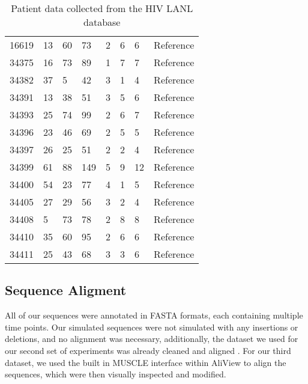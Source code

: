 \begin{table*}[!ht]
\begin{tabularx}{\textwidth}{| X | X | X | X | X | X | X | l |}
16619 &       13 &       60 &       73 &        2 &        6 &        6 & Reference \\ 
34375 &       16 &       73 &       89 &        1 &        7 &        7 & Reference \\ 
34382 &       37 &        5 &       42 &        3 &        1 &        4 & Reference \\ 
34391 &       13 &       38 &       51 &        3 &        5 &        6 & Reference  \\ 
34393 &       25 &       74 &       99 &        2 &        6 &        7 & Reference \\ 
34396 &       23 &       46 &       69 &        2 &        5 &        5 & Reference \\ 
34397 &       26 &       25 &       51 &        2 &        2 &        4 & Reference  \\ 
34399 &       61 &       88 &      149 &        5 &        9 &       12 & Reference \\ 
34400 &       54 &       23 &       77 &        4 &        1 &        5 & Reference \\ 
34405 &       27 &       29 &       56 &        3 &        2 &        4 & Reference \\ 
34408 &        5 &       73 &       78 &        2 &        8 &        8 & Reference\\ 
34410 &       35 &       60 &       95 &        2 &        6 &        6 & Reference\\ 
34411 &       25 &       43 &       68 &        3 &        3 &        6 & Reference   \\ \hline
\end{tabularx}

  \caption{Patient data collected from the HIV LANL database}
\end{table*}

\subsection{Sequence Aligment} \label{subsec:seqalign}
All of our sequences were annotated in FASTA formats, each containing multiple time points. Our simulated sequences were not simulated with any insertions or deletions, and no alignment was necessary, additionally, the dataset we used for our second set of experiments was already cleaned and aligned \citep{McCloskey14}. For our third dataset, we used the built in MUSCLE \citep{Muscle04} interface within AliView \citep{AliView14} to align the sequences, which were then visually inspected and modified. 

